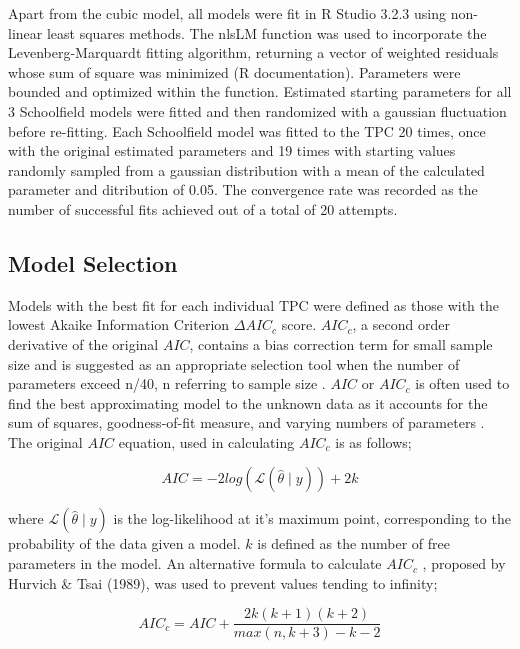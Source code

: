 \documentclass[12pt]{article}
\begin{document}
\begin{linenumbers}
Apart from the cubic model, all models were fit in R Studio 3.2.3 using non-linear least squares methods. The nlsLM function was used to incorporate the Levenberg-Marquardt fitting algorithm, returning a vector of weighted residuals whose sum of square was minimized (R documentation). Parameters were bounded and optimized within the function. Estimated starting parameters for all 3 Schoolfield models were fitted and then randomized with a gaussian fluctuation before re-fitting. Each Schoolfield model was fitted to the TPC 20 times, once with the original estimated parameters and 19 times with starting values randomly sampled from a gaussian distribution with a mean of the calculated parameter and ditribution of 0.05. The convergence rate was recorded as the number of successful fits achieved out of a total of 20 attempts. 

\subsection{Model Selection}
Models with the best fit for each individual TPC were defined as those with the lowest Akaike Information Criterion \(\Delta AIC_c\) score. \(AIC_c\), a second order derivative of the original \(AIC\), contains a bias correction term for small sample size and is suggested as an appropriate selection tool when the number of parameters exceed n/40, n referring to sample size \cite{article2}. \(AIC\) or \(AIC_c\) is often used to find the best approximating model to the unknown data as it accounts for the sum of squares, goodness-of-fit measure, and varying numbers of parameters \cite{citeulike:4425594}. The original \(AIC\) equation, used in calculating \(AIC_c\) is as follows;

\begin{equation}
AIC = -2log({\mathcal{L}}(\hat{\theta}\mid y)) + 2k \tag{6}
\end{equation}

where $\mathcal{L}(\hat{\theta}\mid y)$ is the log-likelihood at it's maximum point, corresponding to the probability of the data given a model. \(k\) is defined as the number of free parameters in the model. An alternative formula to calculate \(AIC_c\) , proposed by Hurvich \& Tsai (1989), was used to prevent values tending to infinity;

\begin{equation}
AIC_c = AIC + \frac{2k(k+1)(k+2)}{max(n,k +3) - k - 2}\tag{7}
\end{equation}


\end{linenumbers}
\end{document}
